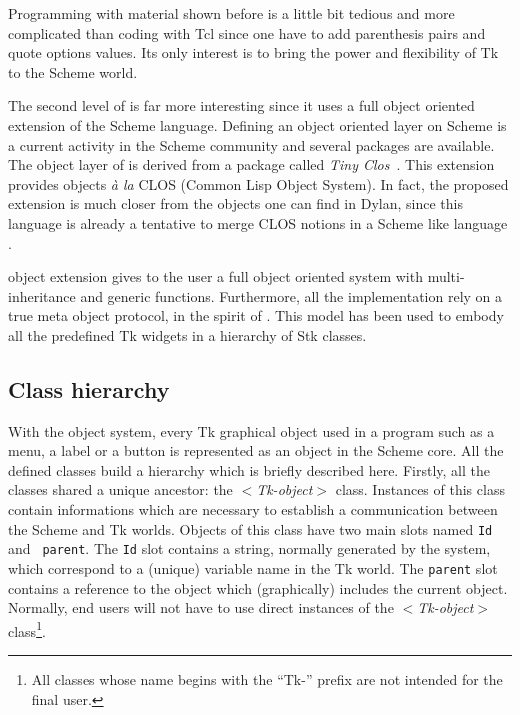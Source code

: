 Programming with material shown before is a little bit tedious and more
complicated than coding with Tcl since one have to add parenthesis pairs and 
quote options values. Its only interest is to bring the power and flexibility of
Tk to the Scheme world. 

The second level of \stk is far more interesting since it uses a full object
oriented extension of the Scheme language. Defining an object oriented layer
on Scheme is a current activity in the Scheme community and several packages
are available. The object layer of \stk is derived from a package called {\em
Tiny Clos}~{\cite{Tiny-Clos}}. This extension provides objects {\em \`a la}
CLOS (Common Lisp Object System). In fact, the proposed extension is much
closer from the objects one can find in Dylan, since this language is already
a tentative to merge CLOS notions in a Scheme like language {\cite{Dylan}}.

\stk object extension gives to the user a full object oriented 
system with multi-inheritance and generic functions. Furthermore, all the
implementation rely on a true meta object protocol, in the spirit of
{\cite{AMOP}}. This model has been used to embody all the predefined Tk
widgets in a hierarchy of Stk classes.

\subsection{Class hierarchy}

With the \stk object system, every Tk graphical object used in a program such
as a menu, a label or a button is represented as an object in the Scheme core.
All the defined {\stk} classes build a hierarchy which is briefly described
here. Firstly, all the classes shared a unique ancestor: the {\em
$<$Tk-object$>$} class. Instances of this class contain informations which are
necessary to establish a communication between the Scheme and Tk worlds.
Objects of this class have two main slots named {\tt Id} and {\tt
parent}. The {\tt Id} slot contains a string, normally
generated by the system, which correspond to a (unique) variable name in the
Tk world. The {\tt parent} slot contains a reference to the object which
(graphically) includes the current object. Normally, end users will not have to
use direct instances of the {\em $<$Tk-object$>$} class\footnote{ All classes
whose name begins with the ``Tk-'' prefix are not intended for the final user.}.


